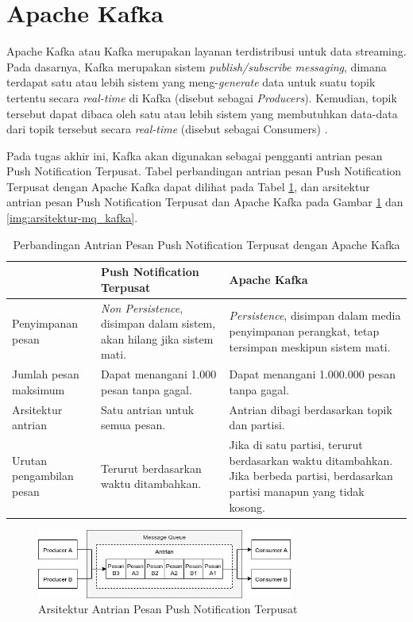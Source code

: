 \section{Apache Kafka}
\par Apache Kafka atau Kafka merupakan layanan terdistribusi untuk data streaming. Pada dasarnya, Kafka merupakan sistem \textit{publish/subscribe messaging}, dimana terdapat satu atau lebih sistem yang meng-\textit{generate} data untuk suatu topik tertentu secara \textit{real-time} di Kafka (disebut sebagai \textit{Producers}). Kemudian, topik tersebut dapat dibaca oleh satu atau lebih sistem yang membutuhkan data-data dari topik tersebut secara \textit{real-time} (disebut sebagai Consumers) \cite{kafka-online}.
\par Pada tugas akhir ini, Kafka akan digunakan sebagai pengganti antrian pesan Push Notification Terpusat. Tabel perbandingan antrian pesan Push Notification Terpusat dengan Apache Kafka dapat dilihat pada Tabel \ref{t:perbandingan_kafka}, dan arsitektur antrian pesan Push Notification Terpusat dan Apache Kafka pada Gambar \ref{img:arsitektur-mq_pnt} dan \ref{img:arsitektur-mq_kafka}.
\begin{longtable}{|p{2.5cm}|p{3.5cm}|p{3.5cm}|}
	\caption{Perbandingan Antrian Pesan Push Notification Terpusat dengan Apache Kafka} \label{t:perbandingan_kafka} \\ \hline
	\rowcolor{lightgray} & Push Notification Terpusat & Apache Kafka \\ \hline
	Penyimpanan pesan & \textit{Non Persistence}, disimpan dalam sistem, akan hilang jika sistem mati. & \textit{Persistence}, disimpan dalam media penyimpanan perangkat, tetap tersimpan meskipun sistem mati. \\ \hline
	Jumlah pesan maksimum & Dapat menangani 1.000 pesan tanpa gagal. & Dapat menangani 1.000.000 pesan tanpa gagal. \\ \hline
	Arsitektur antrian & Satu antrian untuk semua pesan. & Antrian dibagi berdasarkan topik dan partisi. \\ \hline
	Urutan pengambilan pesan & Terurut berdasarkan waktu ditambahkan. & Jika di satu partisi, terurut berdasarkan waktu ditambahkan. Jika berbeda partisi, berdasarkan partisi manapun yang tidak kosong. \\ \hline
\end{longtable}
\begin{figure}[H]
\centering\includegraphics[width=0.75\textwidth]{bab2/img/arsitektur-mq_pnt.jpg}
\caption{Arsitektur Antrian Pesan Push Notification Terpusat}
\label{img:arsitektur-mq_pnt}
\end{figure}
